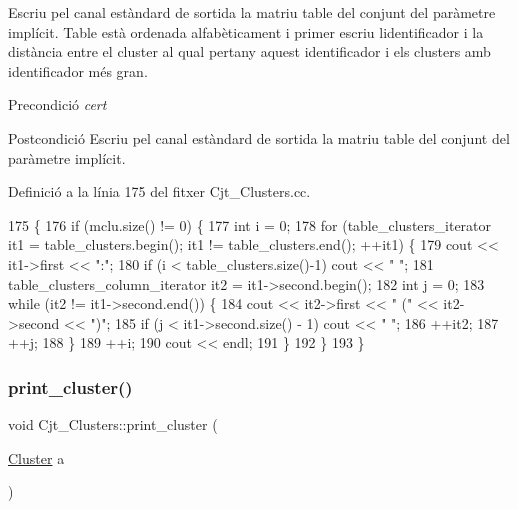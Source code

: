 Escriu pel canal estàndard de sortida la matriu table del conjunt del paràmetre implícit. Table està ordenada alfabèticament i primer escriu l\textquotesingle{}identificador i la distància entre el cluster al qual pertany aquest identificador i els clusters amb identificador més gran.

\begin{DoxyPrecond}{Precondició}
{\itshape cert} 
\end{DoxyPrecond}
\begin{DoxyPostcond}{Postcondició}
Escriu pel canal estàndard de sortida la matriu table del conjunt del paràmetre implícit. 
\end{DoxyPostcond}


Definició a la línia 175 del fitxer Cjt\+\_\+\+Clusters.\+cc.


\begin{DoxyCode}
175                                         \{
176     \textcolor{keywordflow}{if} (mclu.size() != 0) \{
177         \textcolor{keywordtype}{int} i = 0;
178         \textcolor{keywordflow}{for} (table\_clusters\_iterator it1 = table\_clusters.begin(); it1 != table\_clusters.end(); ++it1) \{
179             cout << it1->first << \textcolor{stringliteral}{":"};
180             \textcolor{keywordflow}{if} (i < table\_clusters.size()-1) cout << \textcolor{stringliteral}{" "};
181             table\_clusters\_column\_iterator it2 = it1->second.begin();
182             \textcolor{keywordtype}{int} j = 0;
183             \textcolor{keywordflow}{while} (it2 != it1->second.end()) \{
184                 cout << it2->first << \textcolor{stringliteral}{" ("} << it2->second << \textcolor{stringliteral}{")"};
185                 \textcolor{keywordflow}{if} (j < it1->second.size() - 1) cout << \textcolor{stringliteral}{" "};
186                 ++it2;
187                 ++j;
188             \}
189             ++i;
190             cout << endl;
191         \}
192     \}
193 \}
\end{DoxyCode}
\mbox{\label{class_cjt___clusters_aa9a896c44d86f130747f1e6821a4dddd}} 
\subsubsection{\texorpdfstring{print\+\_\+cluster()}{print\_cluster()}}
{\footnotesize\ttfamily void Cjt\+\_\+\+Clusters\+::print\+\_\+cluster (\begin{DoxyParamCaption}\item[{\hyperlink{class_cluster}{Cluster}}]{a }\end{DoxyParamCaption})}




